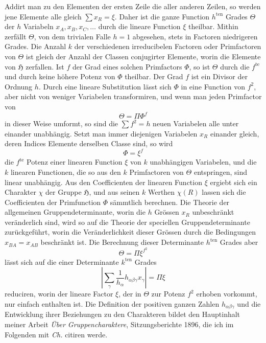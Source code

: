\documentclass[11pt]{article}
\newcommand{\Hgrp}{\mathfrak{H}}
\begin{document}
Addirt man zu den Elementen der ersten Zeile die aller anderen Zeilen, so werden jene Elemente alle gleich $\sum x_R=\xi$. Daher ist die ganze Function $h^{\mathrm{ten}}$ Grades $\Theta$ der $h$ Variabeln $x_A,x_B,x_C,\ldots$ durch die lineare Function $\xi$ theilbar. Mithin zerfällt $\Theta$, von dem trivialen Falle $h=1$ abgesehen, stets in Factoren niedrigeren Grades. Die Anzahl $k$ der verschiedenen irreducibelen Factoren oder Primfactoren von $\Theta$ ist gleich der Anzahl der Classen conjugirter Elemente, worin die Elemente von $\Hgrp$ zerfallen. Ist $f$ der Grad eines solchen Primfactors $\Phi$, so ist $\Theta$ durch die $f^{\mathrm{te}}$ und durch keine höhere Potenz von $\Phi$ theilbar. Der Grad $f$ ist ein Divisor der Ordnung $h$. Durch eine lineare Substitution lässt sich $\Phi$ in eine Function von $f^2$, aber nicht von weniger Variabelen transformiren, und wenn man jeden Primfactor von
\[
\Theta=\Pi \Phi^f
\]
in dieser Weise umformt, so sind die $\sum f^2=h$ neuen Variabelen alle unter einander unabhängig. Setzt man immer diejenigen Variabelen $x_R$ einander gleich, deren Indices Elemente derselben Classe sind, so wird
\[
\Phi=\xi^f
\]
die $f^{\mathrm{te}}$ Potenz einer linearen Function $\xi$ von $k$ unabhängigen Variabelen, und die $k$ linearen Functionen, die so aus den $k$ Primfactoren von $\Theta$ entspringen, sind linear unabhängig. Aus den Coefficienten der linearen Function $\xi$ ergiebt sich ein Charakter $\chi$ der Gruppe $\Hgrp$, und aus seinen $k$ Werthen $\chi(R)$ lassen sich die Coefficienten der Primfunction $\Phi$ sämmtlich berechnen. Die Theorie der allgemeinen Gruppendeterminante, worin die $h$ Grössen $x_R$ unbeschränkt veränderlich sind, wird so auf die Theorie der speciellen Gruppendeterminante zurückgeführt, worin die Veränderlichkeit dieser Grössen durch die Bedingungen $x_{BA}=x_{AB}$ beschränkt ist. Die Berechnung dieser Determinante $h^{\mathrm{ten}}$ Grades aber
\[
\Theta=\Pi \xi^{f^2}
\]
lässt sich auf die einer Determinante $k^{\mathrm{ten}}$ Grades
\[
\left|\sum_\gamma \frac{1}{h_\alpha}h_{\alpha\beta\gamma}x_\gamma\right|=\Pi\xi
\]
reduciren, worin der lineare Factor $\xi$, der in $\Theta$ zur Potenz $f^2$ erhoben vorkommt, nur einfach enthalten ist. Die Definition der positiven ganzen Zahlen $h_{\alpha\beta\gamma}$ und die Entwicklung ihrer Beziehungen zu den Charakteren bildet den Hauptinhalt meiner Arbeit \emph{Über Gruppencharaktere}, Sitzungsberichte 1896, die ich im Folgenden mit \emph{Ch.} citiren werde.
\end{document}
